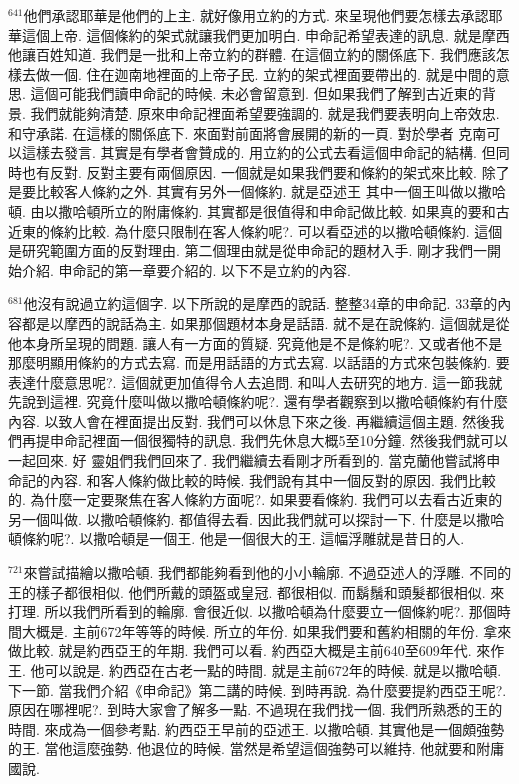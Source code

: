 \documentclass{book}
\begin{document}
$^{641}$他們承認耶華是他們的上主.
就好像用立約的方式.
來呈現他們要怎樣去承認耶華這個上帝.
這個條約的架式就讓我們更加明白.
申命記希望表達的訊息.
就是摩西他讓百姓知道.
我們是一批和上帝立約的群體.
在這個立約的關係底下.
我們應該怎樣去做一個.
住在迦南地裡面的上帝子民.
立約的架式裡面要帶出的.
就是中間的意思.
這個可能我們讀申命記的時候.
未必會留意到.
但如果我們了解到古近東的背景.
我們就能夠清楚.
原來申命記裡面希望要強調的.
就是我們要表明向上帝效忠.
和守承諾.
在這樣的關係底下.
來面對前面將會展開的新的一頁.
對於學者 克南可以這樣去發言.
其實是有學者會贊成的.
用立約的公式去看這個申命記的結構.
但同時也有反對.
反對主要有兩個原因.
一個就是如果我們要和條約的架式來比較.
除了是要比較客人條約之外.
其實有另外一個條約.
就是亞述王 其中一個王叫做以撒哈頓.
由以撒哈頓所立的附庸條約.
其實都是很值得和申命記做比較.
如果真的要和古近東的條約比較.
為什麼只限制在客人條約呢?.
可以看亞述的以撒哈頓條約.
這個是研究範圍方面的反對理由.
第二個理由就是從申命記的題材入手.
剛才我們一開始介紹.
申命記的第一章要介紹的.
以下不是立約的內容.

$^{681}$他沒有說過立約這個字.
以下所說的是摩西的說話.
整整34章的申命記.
33章的內容都是以摩西的說話為主.
如果那個題材本身是話語.
就不是在說條約.
這個就是從他本身所呈現的問題.
讓人有一方面的質疑.
究竟他是不是條約呢?.
又或者他不是那麼明顯用條約的方式去寫.
而是用話語的方式去寫.
以話語的方式來包裝條約.
要表達什麼意思呢?.
這個就更加值得令人去追問.
和叫人去研究的地方.
這一節我就先說到這裡.
究竟什麼叫做以撒哈頓條約呢?.
還有學者觀察到以撒哈頓條約有什麼內容.
以致人會在裡面提出反對.
我們可以休息下來之後.
再繼續這個主題.
然後我們再提申命記裡面一個很獨特的訊息.
我們先休息大概5至10分鐘.
然後我們就可以一起回來.
好 靈姐們我們回來了.
我們繼續去看剛才所看到的.
當克蘭他嘗試將申命記的內容.
和客人條約做比較的時候.
我們說有其中一個反對的原因.
我們比較的.
為什麼一定要聚焦在客人條約方面呢?.
如果要看條約.
我們可以去看古近東的另一個叫做.
以撒哈頓條約.
都值得去看.
因此我們就可以探討一下.
什麼是以撒哈頓條約呢?.
以撒哈頓是一個王.
他是一個很大的王.
這幅浮雕就是昔日的人.

$^{721}$來嘗試描繪以撒哈頓.
我們都能夠看到他的小小輪廓.
不過亞述人的浮雕.
不同的王的樣子都很相似.
他們所戴的頭盔或皇冠.
都很相似.
而鬍鬚和頭髮都很相似.
來打理.
所以我們所看到的輪廓.
會很近似.
以撒哈頓為什麼要立一個條約呢?.
那個時間大概是.
主前672年等等的時候.
所立的年份.
如果我們要和舊約相關的年份.
拿來做比較.
就是約西亞王的年期.
我們可以看.
約西亞大概是主前640至609年代.
來作王.
他可以說是.
約西亞在古老一點的時間.
就是主前672年的時候.
就是以撒哈頓.
下一節.
當我們介紹《申命記》第二講的時候.
到時再說.
為什麼要提約西亞王呢?.
原因在哪裡呢?.
到時大家會了解多一點.
不過現在我們找一個.
我們所熟悉的王的時間.
來成為一個參考點.
約西亞王早前的亞述王.
以撒哈頓.
其實他是一個頗強勢的王.
當他這麼強勢.
他退位的時候.
當然是希望這個強勢可以維持.
他就要和附庸國說.
\end{document}
